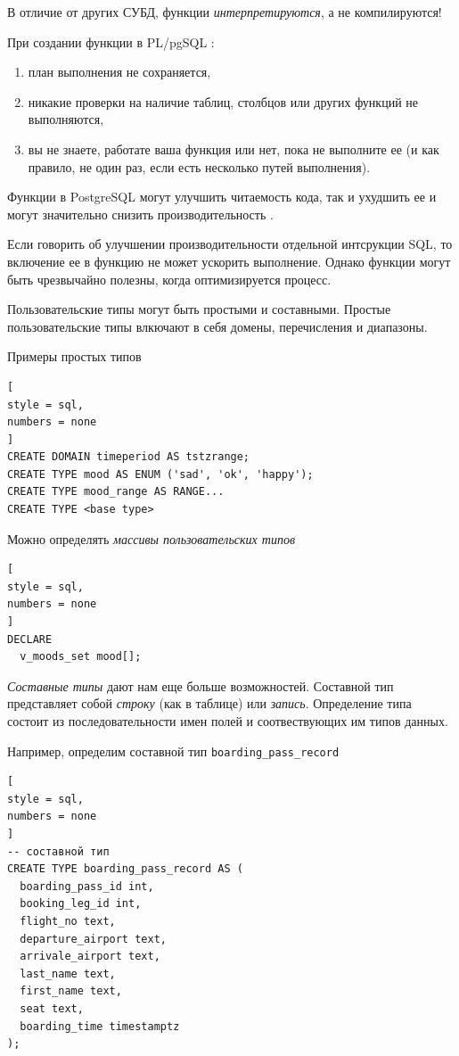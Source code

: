 \documentclass[%
	11pt,
	a4paper,
	utf8,
		]{article}
\begin{document}
В отличие от других СУБД, функции \emph{интерпретируются}, а не компилируются!

При создании функции в PL/pgSQL \cite[]{dombrovskaya:postgresql-2022}:
\begin{enumerate}
	\item план выполнения не сохраняется,
	
	\item никакие проверки на наличие таблиц, столбцов или других функций не выполняются,
	
	\item вы не знаете, работате ваша функция или нет, пока не выполните ее (и как правило, не один раз, если есть несколько путей выполнения).
\end{enumerate}

Функции в PostgreSQL могут улучшить читаемость кода, так и ухудшить ее и могут значительно снизить производительность \cite[]{dombrovskaya:postgresql-2022}.

Если говорить об улучшении производительности отдельной интсрукции SQL, то включение ее в функцию не может ускорить выполнение. Однако функции могут быть чрезвычайно полезны, когда оптимизируется процесс.

Пользовательские типы могут быть простыми и составными. Простые пользовательские типы влкючают в себя домены, перечисления и диапазоны. 

Примеры простых типов
\begin{lstlisting}[
style = sql,
numbers = none
]
CREATE DOMAIN timeperiod AS tstzrange;
CREATE TYPE mood AS ENUM ('sad', 'ok', 'happy');
CREATE TYPE mood_range AS RANGE...
CREATE TYPE <base type>
\end{lstlisting}

Можно определять \emph{массивы пользовательских типов}
\begin{lstlisting}[
style = sql,
numbers = none	
]
DECLARE
  v_moods_set mood[];
\end{lstlisting}

\emph{Составные типы} дают нам еще больше возможностей. Составной тип представляет собой \emph{строку} (как в таблице) или \emph{запись}. Определение типа состоит из последовательности имен полей и соотвествующих им типов данных.

Например, определим составной тип \verb|boarding_pass_record|
\begin{lstlisting}[
style = sql,
numbers = none	
]
-- составной тип
CREATE TYPE boarding_pass_record AS (
  boarding_pass_id int,
  booking_leg_id int,
  flight_no text,
  departure_airport text,
  arrivale_airport text,
  last_name text,
  first_name text,
  seat text,
  boarding_time timestamptz
);
\end{lstlisting}
\end{document}
